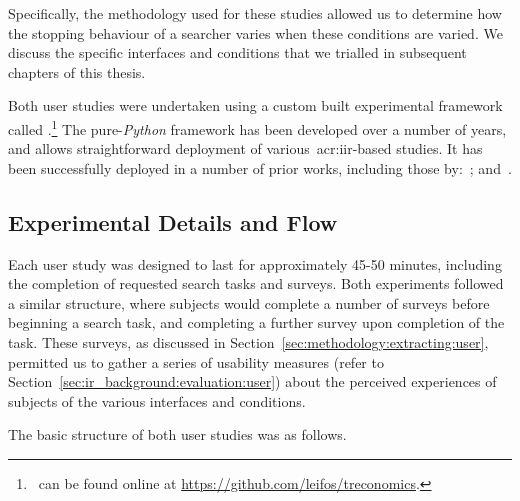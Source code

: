Specifically, the methodology used for these studies allowed us to determine how the stopping behaviour of a searcher varies when these conditions are varied. We discuss the specific interfaces and conditions that we trialled in subsequent chapters of this thesis.

Both user studies were undertaken using a custom built experimental framework called .\footnote{\treconomics~can be found online at \url{https://github.com/leifos/treconomics}. } The pure-\emph{Python} framework has been developed over a number of years, and allows straightforward deployment of various~\gls{acr:iir}-based studies. It has been successfully deployed in a number of prior works, including those by:~\cite{azzopardi2013query_cost, maxwell2014temporal_delays, kelly2015serp_size, edwards2015query_interface}; and~\cite{crescenzi2016time_constraints}.


\subsection{Experimental Details and Flow}\label{sec:methodology:user:flow}
Each user study was designed to last for approximately 45-50 minutes, including the completion of requested search tasks and surveys. Both experiments followed a similar structure, where subjects would complete a number of surveys before beginning a search task, and completing a further survey upon completion of the task. These surveys, as discussed in Section~\ref{sec:methodology:extracting:user}, permitted us to gather a series of usability measures (refer to Section~\ref{sec:ir_background:evaluation:user}) about the perceived experiences of subjects of the various interfaces and conditions.

The basic structure of both user studies was as follows.

